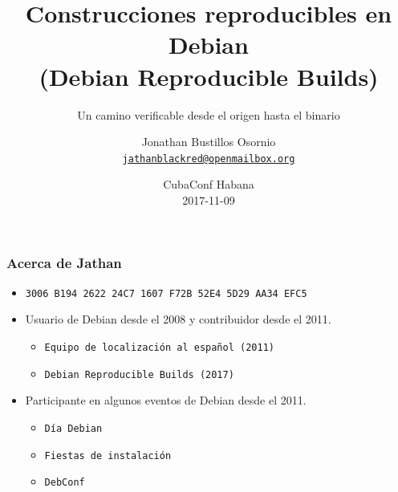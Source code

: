 \documentclass[14pt,aspectratio=169]{beamer}
\title[Reproducible Builds]{Construcciones reproducibles en Debian\\
(Debian Reproducible Builds)}
\subtitle{Un camino verificable desde el origen hasta el binario}
\author[Jathan]{%
   \texorpdfstring{
            Jonathan Bustillos Osornio\\
            \href{mailto:jathanblackred@openmailbox.org}{\texttt{jathanblackred@openmailbox.org}}
   }{Jathan}}
\institute[Debian]{}
\date[CubaConf Habana 2017]{%
 CubaConf Habana\\
 \small
 2017-11-09}
\begin{document}
\begin{frame}
\titlepage
\end{frame}

\begin{frame}
 \frametitle{Acerca de Jathan}

 \begin{itemize}
  \item \small{\texttt{3006 B194 2622 24C7 1607 F72B 52E4 5D29 AA34 EFC5}}
  \item Usuario de Debian desde el 2008 y contribuidor desde el 2011.
    \begin{itemize}
    \item \texttt{Equipo de localización al español (2011)}
    \item \texttt{Debian Reproducible Builds (2017)}
   \end{itemize}   
  \item Participante en algunos eventos de Debian desde el 2011.
   \begin{itemize}
    \item \texttt{Día Debian}
    \item \texttt{Fiestas de instalación}
    \item \texttt{DebConf}
   \end{itemize}
 \end{itemize}
\end{frame}
\end{document}
